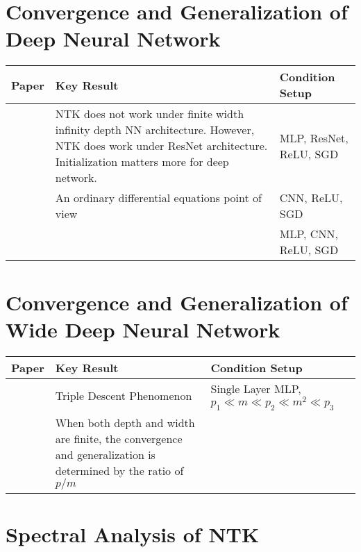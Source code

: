 \documentclass{article}
\begin{document}
\section{Convergence and Generalization of Deep Neural Network}

\begin{table}[H]
\centering
\begin{tabular}{|p{}|p{}|p{}|}
\hline
Paper & Key Result & Condition Setup \\
\hline
\cite{Hayoua,Hayou,Littwin2020,Huang2020}        & NTK does not work under finite width infinity depth NN architecture. However, NTK does work under ResNet architecture. Initialization matters more for deep network. & MLP, ResNet, ReLU, SGD \\
\hline
\cite{Huang}        & An ordinary differential equations point of view & CNN, ReLU, SGD \\
\hline
\cite{Lee}        &  & MLP, CNN, ReLU, SGD \\
\hline
\end{tabular}
\end{table}

\section{Convergence and Generalization of Wide Deep Neural Network}

\begin{table}[H]
\centering
\begin{tabular}{|p{}|p{}|p{}|}
\hline
Paper & Key Result & Condition Setup \\
\hline
\cite{Adlam}        & Triple Descent Phenomenon & Single Layer MLP, $p_1 \ll m \ll p_2 \ll m^2 \ll p_3$ \\
\hline
\cite{Hanin2020,Cao}        & When both depth and width are finite, the convergence and generalization is determined by the ratio of $p/m$ &  \\
\hline
\end{tabular}
\end{table}

\section{Spectral Analysis of NTK}
\end{document}
